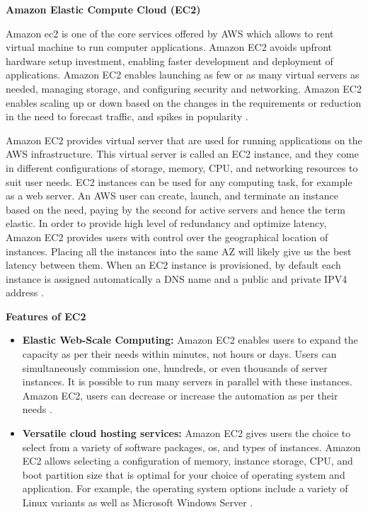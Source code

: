 \textbf{Amazon Elastic Compute Cloud (EC2)}

\par Amazon \gls{ec2} is one of the core services offered by
AWS
which
allows to rent virtual machine to run computer
applications.
Amazon EC2 avoids upfront hardware setup investment, enabling faster development and deployment of applications.
Amazon EC2 enables launching as few or as many virtual servers as needed, managing storage, and configuring security and networking.
Amazon EC2 enables scaling up or down based on the
changes in the requirements or reduction in the need to forecast traffic, and spikes in popularity \cite{29}.

\par Amazon EC2 provides virtual server that are used for
running applications on the AWS infrastructure.
This
virtual server is called an EC2 instance, and they come
in different configurations of storage, memory, CPU, and networking resources to suit user needs.
EC2 instances can be used for any computing task, for example as a web server.
An AWS user can create, launch, and terminate an instance based on the need, paying by the second for active servers and hence the term elastic.
In order to provide high level of redundancy and optimize latency, Amazon EC2 provides users with control over the geographical location of instances.
Placing all the instances into the same AZ will likely give us the best latency between them.
When an EC2 instance is provisioned, by default each instance is assigned automatically a DNS name and a public and private IPV4 address \cite{30}.

\clearpage
\textbf{Features of EC2}
\begin{itemize}
    \item \textbf{Elastic Web-Scale Computing:} Amazon EC2 enables users to expand the capacity as per their needs within minutes, not hours or days.
    Users can simultaneously commission one, hundreds, or even thousands of server instances.
    It is possible to run many servers in
    parallel
    with these instances.
    Amazon EC2, users can decrease or increase the
    automation as per their needs \cite{31}.
\end{itemize}

\begin{itemize}
    \item \textbf{Versatile cloud hosting services:} Amazon EC2 gives users the choice to select from a variety of software packages, os, and types of instances.
    Amazon EC2 allows selecting a configuration of memory, instance storage, CPU, and boot partition size that is optimal for your choice of operating system and application. For example, the operating system options include a variety of Linux variants as well as Microsoft Windows Server \cite{29}.
\end{itemize}

